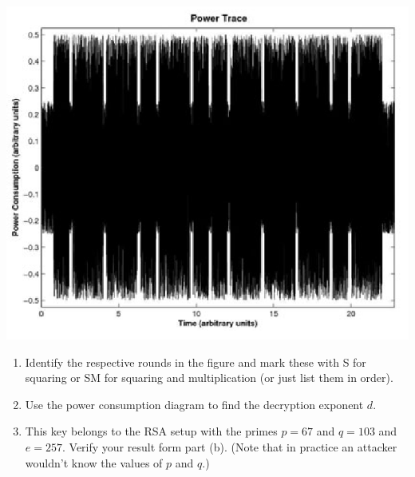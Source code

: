 \documentclass[11pt,letterpaper]{article}
\begin{document}
\begin{enumerate}
\begin{center}
    \includegraphics[scale=.45]{side channel.PNG}
\end{center}

\begin{enumerate}
    \item Identify the respective rounds in the figure and mark these with S for squaring or SM for squaring and multiplication (or just list them in order).

    \item Use the power consumption diagram to find the decryption exponent $d$.

    \item This key belongs to the RSA setup with the primes $p=67$ and $q=103$ and $e=257$.
    Verify your result form part (b). (Note that in practice an attacker wouldn't know the values of $p$ and $q$.)
\end{enumerate}

    

\end{enumerate}
\end{document}
